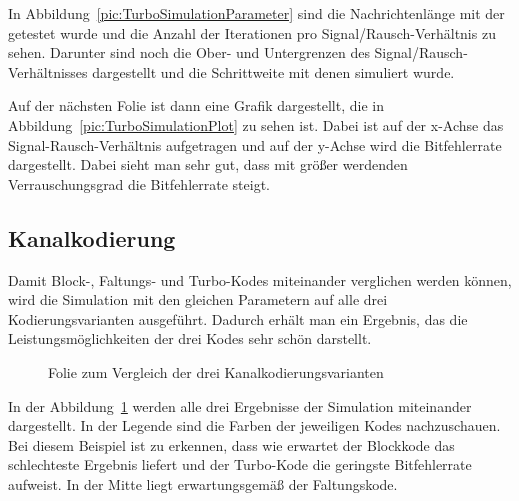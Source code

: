 In Abbildung~\ref{pic:TurboSimulationParameter} sind die Nachrichtenlänge mit der getestet wurde und die Anzahl der Iterationen pro Signal/Rausch-Verhältnis zu sehen. Darunter sind noch die Ober- und Untergrenzen des Signal/Rausch-Verhältnisses dargestellt und die Schrittweite mit denen simuliert wurde.

Auf der nächsten Folie ist dann eine Grafik dargestellt, die in Abbildung~\ref{pic:TurboSimulationPlot} zu sehen ist. Dabei ist auf der x-Achse das Signal-Rausch-Verhältnis aufgetragen und auf der y-Achse wird die Bitfehlerrate dargestellt. Dabei sieht man sehr gut, dass mit größer werdenden Verrauschungsgrad die Bitfehlerrate steigt.

\FloatBarrier
\subsection{Kanalkodierung}
\label{sec:visualization_simulations_channelcoding}
Damit Block-, Faltungs- und Turbo-Kodes miteinander verglichen werden können, wird die Simulation mit den gleichen Parametern auf alle drei Kodierungsvarianten ausgeführt. Dadurch erhält man ein Ergebnis, das die Leistungsmöglichkeiten der drei Kodes sehr schön darstellt.

\begin{figure}[th]
\centering
{}
\caption{Folie zum Vergleich der drei Kanalkodierungsvarianten}
\label{pic:ChannelcodingSimulation}
\end{figure}

In der Abbildung~\ref{pic:ChannelcodingSimulation} werden alle drei Ergebnisse der Simulation miteinander dargestellt. In der Legende sind die Farben der jeweiligen Kodes nachzuschauen. Bei diesem Beispiel ist zu erkennen, dass wie erwartet der Blockkode das schlechteste Ergebnis liefert und der Turbo-Kode die geringste Bitfehlerrate aufweist. In der Mitte liegt erwartungsgemäß der Faltungskode.

